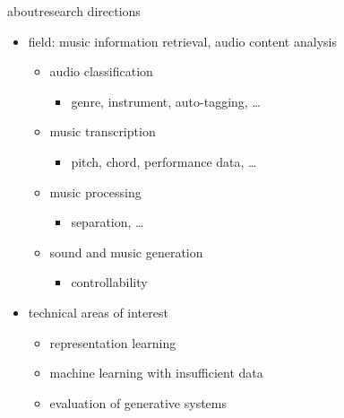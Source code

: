 \begin{frame}{about}{research directions}
    \begin{itemize}
				\item	field: music information retrieval, audio content analysis
					\begin{itemize}
						\item audio classification 
							\begin{itemize}
								\item genre, instrument, auto-tagging, \ldots
							\end{itemize}
						\smallskip
						\item	music transcription 
							\begin{itemize}
								\item pitch, chord, performance data, \ldots
							\end{itemize}
						\smallskip
						\item	music processing 
							\begin{itemize}
								\item separation, \ldots
							\end{itemize}
						\smallskip
						\item	sound and music generation
							\begin{itemize}
								\item controllability
							\end{itemize}
					\end{itemize}
				\bigskip
				\item<2->	technical areas of interest
					\begin{itemize}
						\item   representation learning
						\smallskip
						\item		machine learning with insufficient data
						\smallskip
						\item		evaluation of generative systems
					\end{itemize}
    \end{itemize}
    
\end{frame}
